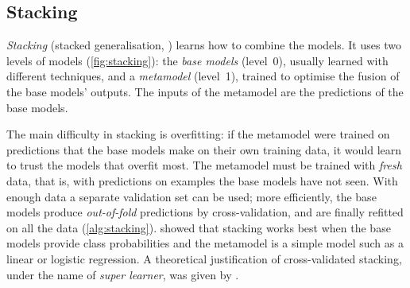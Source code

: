 \subsection{Stacking}

\emph{Stacking} (stacked generalisation, \citealp{wolpert1992stacked}) learns how to combine
the models. It uses two levels of models (\cref{fig:stacking}): the \emph{base models}
(level~0), usually learned with different techniques, and a \emph{metamodel} (level~1),
trained to optimise the fusion of the base models' outputs. The inputs of the metamodel are the
predictions of the base models.

The main difficulty in stacking is overfitting: if the metamodel were trained on predictions that
the base models make on their own training data, it would learn to trust the models that overfit
most. The metamodel must be trained with \emph{fresh} data, that is, with predictions on
examples the base models have not seen. With enough data a separate validation set can be used;
more efficiently, the base models produce \emph{out-of-fold} predictions by cross-validation,
and are finally refitted on all the data (\cref{alg:stacking}). \citet{ting1999issues} showed
that stacking works best when the base models provide class probabilities and the metamodel is a simple model such as a linear or logistic regression. A
theoretical justification of cross-validated stacking, under the name of \emph{super learner},
was given by \citet{vanderlaan2007super}.

